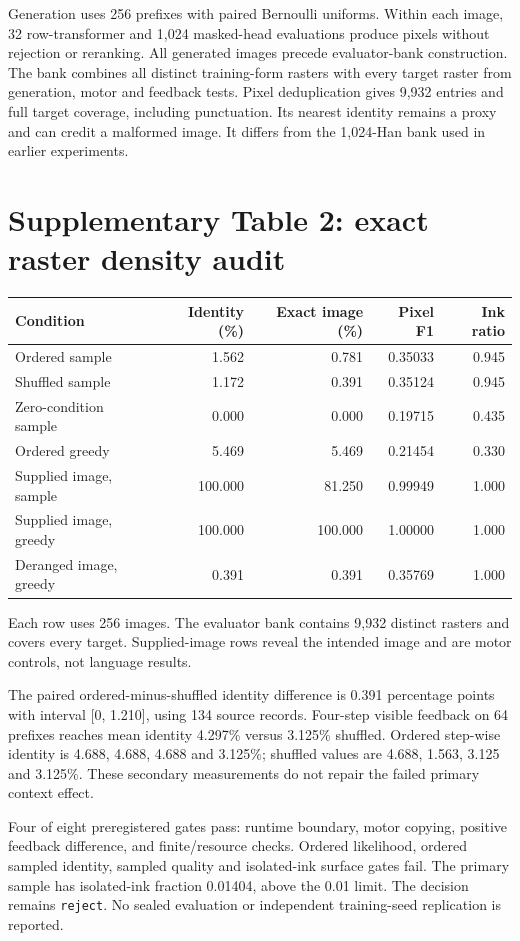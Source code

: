 \documentclass[10pt,a4paper]{article}
\newcommand{\DensityDecision}{reject}
\begin{document}
Generation uses 256 prefixes with paired Bernoulli uniforms. Within each
image, 32 row-transformer and 1,024 masked-head evaluations produce pixels
without rejection or reranking. All generated images precede evaluator-bank
construction. The bank combines all distinct training-form rasters with every
target raster from generation, motor and feedback tests. Pixel deduplication
gives 9,932 entries and full target coverage, including punctuation. Its
nearest identity remains a proxy and can credit a malformed image. It differs
from the 1,024-Han bank used in earlier experiments.

\section*{Supplementary Table 2: exact raster density audit}
\begin{center}\begin{tabular}{lrrrr}\toprule
Condition & Identity (\%) & Exact image (\%) & Pixel F1 & Ink ratio \\
\midrule
Ordered sample & 1.562 & 0.781 & 0.35033 & 0.945 \\
Shuffled sample & 1.172 & 0.391 & 0.35124 & 0.945 \\
Zero-condition sample & 0.000 & 0.000 & 0.19715 & 0.435 \\
Ordered greedy & 5.469 & 5.469 & 0.21454 & 0.330 \\
Supplied image, sample & 100.000 & 81.250 & 0.99949 & 1.000 \\
Supplied image, greedy & 100.000 & 100.000 & 1.00000 & 1.000 \\
Deranged image, greedy & 0.391 & 0.391 & 0.35769 & 1.000 \\
\bottomrule\end{tabular}\end{center}
Each row uses 256 images. The evaluator bank contains 9,932 distinct rasters and covers every target. Supplied-image rows reveal the intended image and are motor controls, not language results.


The paired ordered-minus-shuffled identity difference is 0.391 percentage
points with interval [0, 1.210], using 134 source records. Four-step visible
feedback on 64 prefixes reaches mean identity 4.297\% versus 3.125\% shuffled.
Ordered step-wise identity is 4.688, 4.688, 4.688 and 3.125\%; shuffled values
are 4.688, 1.563, 3.125 and 3.125\%. These secondary measurements do not
repair the failed primary context effect.

Four of eight preregistered gates pass: runtime boundary, motor copying,
positive feedback difference, and finite/resource checks. Ordered likelihood,
ordered sampled identity, sampled quality and isolated-ink surface gates fail.
The primary sample has isolated-ink fraction 0.01404, above the 0.01 limit.
The decision remains \texttt{\DensityDecision}. No sealed evaluation or
independent training-seed replication is reported.
\end{document}
